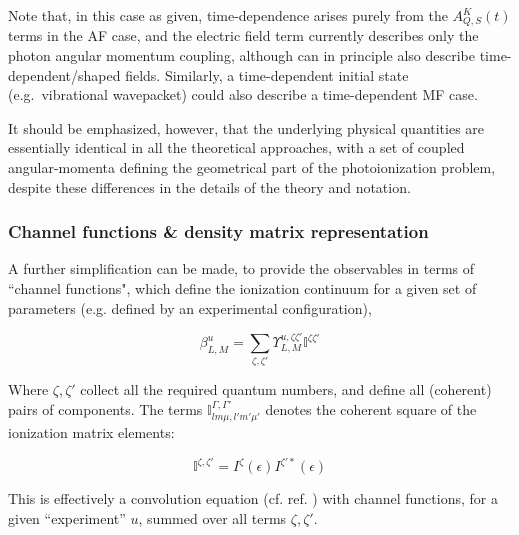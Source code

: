 Note that, in this case as given, time-dependence arises purely from the \(A_{Q,S}^{K}(t)\) terms in the AF case, and the electric field term currently describes only the photon angular momentum coupling,
although can in principle also describe time-dependent/shaped fields. Similarly, a time-dependent initial state (e.g.~vibrational wavepacket) could also describe a time-dependent MF case.

It should be emphasized, however, that the underlying physical quantities are essentially identical in all the theoretical approaches, with a set of coupled angular-momenta defining the geometrical part of the photoionization problem, despite these differences in the details of the theory and notation. 


\subsubsection{Channel functions \& density matrix representation}

A further simplification can be made, to provide the observables in terms of ``channel functions", which define the ionization continuum for a given set of parameters (e.g. defined by an experimental configuration),

\begin{equation}
\beta_{L,M}^{u}=\sum_{\zeta,\zeta'}\varUpsilon_{L,M}^{u,\zeta\zeta'}\mathbb{I}^{\zeta\zeta'}\label{eqn:channel-fns}
\end{equation}


Where $\zeta,\zeta'$ collect all the required quantum numbers, and define all (coherent) pairs of components. The terms $\mathbb{I}_{lm\mu,l'm'\mu'}^{\Gamma,\Gamma'}$ denotes the coherent square of the ionization matrix elements:

\begin{equation}
\mathbb{I}^{\zeta,\zeta'}=I^{\zeta}(\epsilon)I^{\zeta'*}(\epsilon)
\end{equation}

This is effectively a convolution equation (cf. ref. \cite{Reid2000}) with channel functions, for
a given ``experiment'' $u$, summed over all terms $\zeta,\zeta'$.

